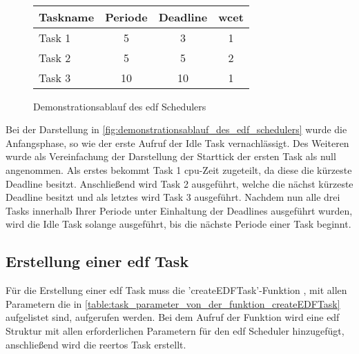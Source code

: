 \documentclass[../EDF Master Thesis.tex]{subfiles}
\begin{document}
\begin{figure}[ht!]
\begin{tikzpicture}
        \end{tikzpicture}\\
        \vspace {1cm}
        \begin{tabular}{l|c|c|c}
            Taskname & Periode & Deadline & \ac{wcet} \\
            \hline
            Task 1 & 5 & 3 & 1 \\
            Task 2 & 5 & 5 & 2 \\
            Task 3 & 10 & 10 & 1 
        \end{tabular}
        \caption{Demonstrationsablauf des \ac{edf} Schedulers}
        \label{fig:demonstrationsablauf_des_edf_schedulers}
    \end{figure}

    Bei der Darstellung in \autoref{fig:demonstrationsablauf_des_edf_schedulers} wurde die Anfangsphase, so wie der erste Aufruf der Idle Task vernachlässigt.
    Des Weiteren wurde als Vereinfachung der Darstellung der Starttick der ersten Task als null angenommen.
    Als erstes bekommt Task 1 \ac{cpu}-Zeit zugeteilt, da diese die kürzeste Deadline besitzt.
    Anschließend wird Task 2 ausgeführt, welche die nächst kürzeste Deadline besitzt und als letztes wird Task 3 ausgeführt.
    Nachdem nun alle drei Tasks innerhalb Ihrer Periode unter Einhaltung der Deadlines ausgeführt wurden, wird die Idle Task solange ausgeführt, bis die nächste Periode einer Task beginnt.


\subsection{Erstellung einer \ac{edf} Task} \label{section:erstellung_einer_edf_task}

    Für die Erstellung einer \ac{edf} Task muss die 'createEDFTask'-Funktion , mit allen Parametern die in \autoref{table:task_parameter_von_der_funktion_createEDFTask} aufgelistet sind, aufgerufen werden.
    Bei dem Aufruf der Funktion wird eine \ac{edf} Struktur mit allen erforderlichen Parametern für den \ac{edf} Scheduler hinzugefügt, anschließend wird die \ac{reertos} Task erstellt.
\end{document}
